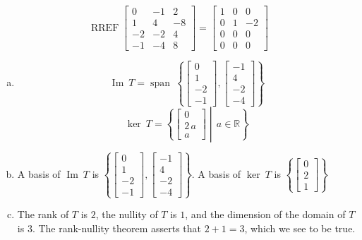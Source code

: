 \begin{exerciseAnswer} 


\[\operatorname{RREF} \left[\begin{array}{ccc}
0 & -1 & 2 \\
1 & 4 & -8 \\
-2 & -2 & 4 \\
-1 & -4 & 8
\end{array}\right] = \left[\begin{array}{ccc}
1 & 0 & 0 \\
0 & 1 & -2 \\
0 & 0 & 0 \\
0 & 0 & 0
\end{array}\right] \]


\begin{enumerate}[(a)]
\item \[\operatorname{Im}\ T = \operatorname{span}\  \left\{ \left[\begin{array}{c}
0 \\
1 \\
-2 \\
-1
\end{array}\right] , \left[\begin{array}{c}
-1 \\
4 \\
-2 \\
-4
\end{array}\right] \right\} \]\[\operatorname{ker}\ T =  \left\{ \left[\begin{array}{c}
0 \\
2 \, a \\
a
\end{array}\right] \middle|\,a\in\mathbb{R}\right\} \]
\item  A basis of \(\operatorname{Im}\ T\) is \( \left\{ \left[\begin{array}{c}
0 \\
1 \\
-2 \\
-1
\end{array}\right] , \left[\begin{array}{c}
-1 \\
4 \\
-2 \\
-4
\end{array}\right] \right\} \). A basis of \(\operatorname{ker}\ T\) is \( \left\{ \left[\begin{array}{c}
0 \\
2 \\
1
\end{array}\right] \right\} \)
\item  The rank of \(T\) is \( 2 \), the nullity of \(T\) is \( 1 \), and the dimension of the domain of \(T\) is \( 3 \). The rank-nullity theorem asserts that \( 2 + 1 = 3 \), which we see to be true. 
\end{enumerate}
    
\end{exerciseAnswer}
    

